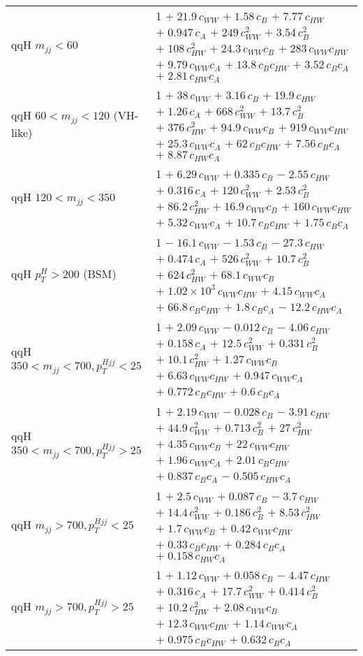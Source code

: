 \begin{tabular}{l|p{}}
    qqH $m_{jj} < 60$ & 1 $+\;21.9\,c_{WW}$ $+\;1.58\,c_{B}$ $+\;7.77\,c_{HW}$ $+\;0.947\,c_{A}$ $+\;249\,c_{WW}^{2}$ $+\;3.54\,c_{B}^{2}$ $+\;108\,c_{HW}^{2}$ $+\;24.3\,c_{WW}c_{B}$ $+\;283\,c_{WW}c_{HW}$ $+\;9.79\,c_{WW}c_{A}$ $+\;13.8\,c_{B}c_{HW}$ $+\;3.52\,c_{B}c_{A}$ $+\;2.81\,c_{HW}c_{A}$ \\
    qqH $60 < m_{jj} < 120$ (VH-like) & 1 $+\;38\,c_{WW}$ $+\;3.16\,c_{B}$ $+\;19.9\,c_{HW}$ $+\;1.26\,c_{A}$ $+\;668\,c_{WW}^{2}$ $+\;13.7\,c_{B}^{2}$ $+\;376\,c_{HW}^{2}$ $+\;94.9\,c_{WW}c_{B}$ $+\;919\,c_{WW}c_{HW}$ $+\;25.3\,c_{WW}c_{A}$ $+\;62\,c_{B}c_{HW}$ $+\;7.56\,c_{B}c_{A}$ $+\;8.87\,c_{HW}c_{A}$ \\
    qqH $120 < m_{jj} < 350$ & 1 $+\;6.29\,c_{WW}$ $+\;0.335\,c_{B}$ $-\;2.55\,c_{HW}$ $+\;0.316\,c_{A}$ $+\;120\,c_{WW}^{2}$ $+\;2.53\,c_{B}^{2}$ $+\;86.2\,c_{HW}^{2}$ $+\;16.9\,c_{WW}c_{B}$ $+\;160\,c_{WW}c_{HW}$ $+\;5.32\,c_{WW}c_{A}$ $+\;10.7\,c_{B}c_{HW}$ $+\;1.75\,c_{B}c_{A}$ \\
    qqH $p_{T}^{H} > 200$ (BSM) & 1 $-\;16.1\,c_{WW}$ $-\;1.53\,c_{B}$ $-\;27.3\,c_{HW}$ $+\;0.474\,c_{A}$ $+\;526\,c_{WW}^{2}$ $+\;10.7\,c_{B}^{2}$ $+\;624\,c_{HW}^{2}$ $+\;68.1\,c_{WW}c_{B}$ $+\;1.02\times 10^{3}\,c_{WW}c_{HW}$ $+\;4.15\,c_{WW}c_{A}$ $+\;66.8\,c_{B}c_{HW}$ $+\;1.8\,c_{B}c_{A}$ $-\;12.2\,c_{HW}c_{A}$ \\
    qqH $350 < m_{jj} < 700, p_{T}^{Hjj} < 25$ & 1 $+\;2.09\,c_{WW}$ $-\;0.012\,c_{B}$ $-\;4.06\,c_{HW}$ $+\;0.158\,c_{A}$ $+\;12.5\,c_{WW}^{2}$ $+\;0.331\,c_{B}^{2}$ $+\;10.1\,c_{HW}^{2}$ $+\;1.27\,c_{WW}c_{B}$ $+\;6.63\,c_{WW}c_{HW}$ $+\;0.947\,c_{WW}c_{A}$ $+\;0.772\,c_{B}c_{HW}$ $+\;0.6\,c_{B}c_{A}$ \\
    qqH $350 < m_{jj} < 700, p_{T}^{Hjj} > 25$ & 1 $+\;2.19\,c_{WW}$ $-\;0.028\,c_{B}$ $-\;3.91\,c_{HW}$ $+\;44.9\,c_{WW}^{2}$ $+\;0.713\,c_{B}^{2}$ $+\;27\,c_{HW}^{2}$ $+\;4.35\,c_{WW}c_{B}$ $+\;22\,c_{WW}c_{HW}$ $+\;1.96\,c_{WW}c_{A}$ $+\;2.01\,c_{B}c_{HW}$ $+\;0.837\,c_{B}c_{A}$ $-\;0.505\,c_{HW}c_{A}$ \\
    qqH $m_{jj} > 700, p_{T}^{Hjj} < 25$ & 1 $+\;2.5\,c_{WW}$ $+\;0.087\,c_{B}$ $-\;3.7\,c_{HW}$ $+\;14.4\,c_{WW}^{2}$ $+\;0.186\,c_{B}^{2}$ $+\;8.53\,c_{HW}^{2}$ $+\;1.7\,c_{WW}c_{B}$ $+\;0.42\,c_{WW}c_{HW}$ $+\;0.33\,c_{B}c_{HW}$ $+\;0.284\,c_{B}c_{A}$ $+\;0.158\,c_{HW}c_{A}$ \\
    qqH $m_{jj} > 700, p_{T}^{Hjj} > 25$ & 1 $+\;1.12\,c_{WW}$ $+\;0.058\,c_{B}$ $-\;4.47\,c_{HW}$ $+\;0.316\,c_{A}$ $+\;17.7\,c_{WW}^{2}$ $+\;0.414\,c_{B}^{2}$ $+\;10.2\,c_{HW}^{2}$ $+\;2.08\,c_{WW}c_{B}$ $+\;12.3\,c_{WW}c_{HW}$ $+\;1.14\,c_{WW}c_{A}$ $+\;0.975\,c_{B}c_{HW}$ $+\;0.632\,c_{B}c_{A}$ \\
    \hline
\end{tabular}